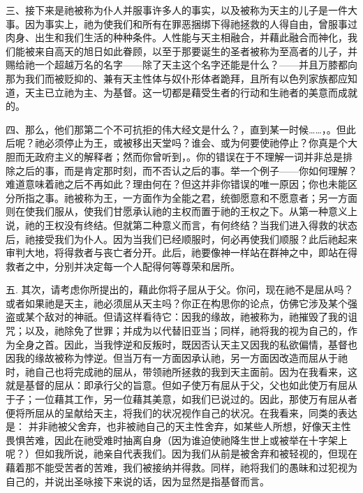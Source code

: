 三、接下来是祂被称为仆人并服事许多人的事实，以及被称为天主的儿子是一件大事。因为事实上，祂为使我们和所有在罪恶捆绑下得祂拯救的人得自由，曾服事过肉身、出生和我们生活的种种条件。人性能与天主相融合，并藉此融合而神化，我们能被来自高天的旭日如此眷顾，以至于那要诞生的圣者被称为至高者的儿子，并赐给祂一个超越万名的名字——除了天主这个名字还能是什么？——并且万膝都向那为我们而被贬抑的、兼有天主性体与奴仆形体者跪拜，且所有以色列家族都应知道，天主已立祂为主、为基督。这一切都是藉受生者的行动和生祂者的美意而成就的。\par

四、那么，他们那第二个不可抗拒的伟大经文是什么？，直到某一时候……，。但此后呢？祂必须停止为王，或被移出天堂吗？谁会、或为何要使祂停止？你真是个大胆而无政府主义的解释者；然而你曾听到，。你的错误在于不理解一词并非总是排除之后的事，而是肯定那时刻，而不否认之后的事。举一个例子——你如何理解？难道意味着祂之后不再如此？理由何在？但这并非你错误的唯一原因；你也未能区分所指之事。祂被称为王，一方面作为全能之君，统御愿意和不愿意者；另一方面则在使我们服从，使我们甘愿承认祂的主权而置于祂的王权之下。从第一种意义上说，祂的王权没有终结。但就第二种意义而言，有何终结？当我们进入得救的状态后，祂接受我们为仆人。因为当我们已经顺服时，何必再使我们顺服？此后祂起来审判大地，将得救者与丧亡者分开。此后，祂要像神一样站在群神之中，即站在得救者之中，分别并决定每一个人配得何等尊荣和居所。\par

五. 其次，请考虑你所提出的，藉此你将子屈从于父。你问，现在祂不是屈从吗？或者如果祂是天主，祂必须屈从天主吗？你正在构思你的论点，仿佛它涉及某个强盗或某个敌对的神祇。但请这样看待它：因我的缘故，祂被称为，祂摧毁了我的诅咒；以及，祂除免了世罪；并成为以代替旧亚当；同样，祂将我的视为自己的，作为全身之首。因此，当我悖逆和反叛时，既因否认天主又因我的私欲偏情，基督也因我的缘故被称为悖逆。但当万有一方面因承认祂，另一方面因改造而屈从于祂时，祂自己也将完成祂的屈从，带领祂所拯救的我到天主面前。因为在我看来，这就是基督的屈从：即承行父的旨意。但如子使万有屈从于父，父也如此使万有屈从于子；一位藉其工作，另一位藉其美意，如我们已说过的。因此，那使万有屈从者便将所屈从的呈献给天主，将我们的状况视作自己的状况。在我看来，同类的表达是： 并非祂被父舍弃，也非被祂自己的天主性舍弃，如某些人所想，好像天主性畏惧苦难，因此在祂受难时抽离自身（因为谁迫使祂降生世上或被举在十字架上呢？）但如我所说，祂亲自代表我们。因为我们从前是被舍弃和被轻视的，但现在藉着那不能受苦者的苦难，我们被接纳并得救。同样，祂将我们的愚昧和过犯视为自己的，并说出圣咏接下来说的话，因为显然是指基督而言。\par


